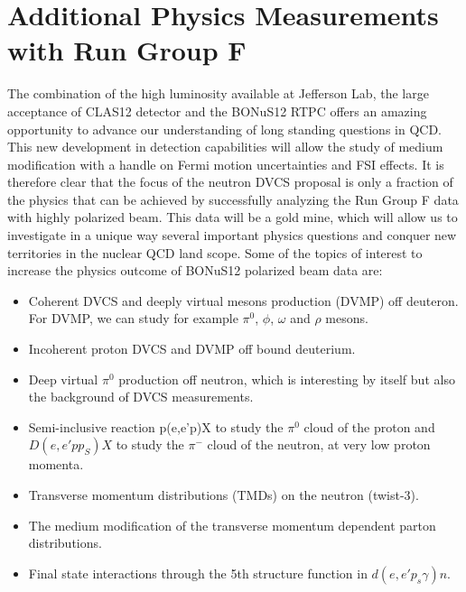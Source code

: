  \chapter{Additional Physics Measurements with Run Group F}
 \label{chap:additional}

The combination of the high luminosity available at Jefferson Lab, the large 
acceptance of CLAS12 detector and the BONuS12 RTPC offers an amazing 
opportunity to advance our understanding of long standing questions in QCD.  
This new development in detection capabilities will allow the study of medium 
modification with a handle on Fermi motion uncertainties and FSI effects. It is 
therefore clear that the focus of the neutron DVCS proposal is only a fraction 
of the physics that can be achieved by successfully analyzing the Run Group F 
data with highly polarized beam. This data will be a gold mine, which will 
allow us to investigate in a unique way several important physics questions and 
conquer new territories in the nuclear QCD land scope. Some of the topics of 
interest to increase the physics outcome of BONuS12 polarized beam data are:

\begin{itemize}
\item Coherent DVCS and deeply virtual mesons production (DVMP) off deuteron.  
   For DVMP, we can study for example $\pi^0$, $\phi$, $\omega$ and $\rho$ 
      mesons.

\item Incoherent proton DVCS and DVMP off bound deuterium.

\item Deep virtual $\pi^0$ production off neutron, which is interesting by 
   itself but also the background of DVCS measurements.
\item Semi-inclusive reaction p(e,e'p)X to study the $\pi^0$ cloud of the 
   proton and $D(e, e' pp_S)X$ to study the $\pi^-$ cloud of the neutron, at 
      very low proton momenta.
   \item Transverse momentum distributions (TMDs) on the neutron (twist-3).
\item The medium modification of the transverse momentum dependent parton 
   distributions.
\item Final state interactions through the 5th structure function in 
$d(e,e'p_s\gamma)n$.  \end{itemize}


